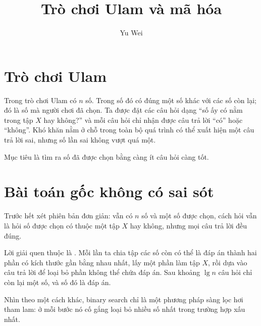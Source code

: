 \documentclass[11pt]{article}
\title{Trò chơi Ulam và mã hóa}
\author{Yu Wei}
\date{}
\begin{document}
\maketitle


\section{Trò chơi Ulam}

Trong trò chơi Ulam có \(n\) số. Trong số đó có đúng một số khác với các số
còn lại; đó là số mà người chơi đã chọn. Ta được đặt các câu hỏi dạng
``số ấy có nằm trong tập \(X\) hay không?'' và mỗi câu hỏi chỉ nhận được câu
trả lời ``có'' hoặc ``không''. Khó khăn nằm ở chỗ trong toàn bộ quá trình có
thể xuất hiện một câu trả lời sai, nhưng số lần sai không vượt quá một.

Mục tiêu là tìm ra số đã được chọn bằng càng ít câu hỏi càng tốt.

\section{Bài toán gốc không có sai sót}

Trước hết xét phiên bản đơn giản: vẫn có \(n\) số và một số được chọn, cách
hỏi vẫn là hỏi số được chọn có thuộc một tập \(X\) hay không, nhưng mọi câu
trả lời đều đúng.

Lời giải quen thuộc là . Mỗi lần ta chia tập các số còn
có thể là đáp án thành hai phần có kích thước gần bằng nhau nhất, lấy một
phần làm tập \(X\), rồi dựa vào câu trả lời để loại bỏ phần không thể chứa
đáp án. Sau khoảng \(\lg n\) câu hỏi chỉ còn lại một số, và số đó là đáp án.

Nhìn theo một cách khác, binary search chỉ là một phương pháp sàng lọc hơi
tham lam: ở mỗi bước nó cố gắng loại bỏ nhiều số nhất trong trường hợp xấu
nhất.

\begin{center}
\end{center}
\end{document}
